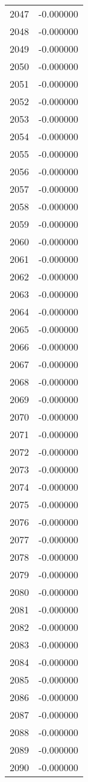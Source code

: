 \documentclass[12pt]{article}
\begin{document}
\begin{longtable}{@{}cc@{}}
2047 & -0.000000 \\
2048 & -0.000000 \\
2049 & -0.000000 \\
2050 & -0.000000 \\
2051 & -0.000000 \\
2052 & -0.000000 \\
2053 & -0.000000 \\
2054 & -0.000000 \\
2055 & -0.000000 \\
2056 & -0.000000 \\
2057 & -0.000000 \\
2058 & -0.000000 \\
2059 & -0.000000 \\
2060 & -0.000000 \\
2061 & -0.000000 \\
2062 & -0.000000 \\
2063 & -0.000000 \\
2064 & -0.000000 \\
2065 & -0.000000 \\
2066 & -0.000000 \\
2067 & -0.000000 \\
2068 & -0.000000 \\
2069 & -0.000000 \\
2070 & -0.000000 \\
2071 & -0.000000 \\
2072 & -0.000000 \\
2073 & -0.000000 \\
2074 & -0.000000 \\
2075 & -0.000000 \\
2076 & -0.000000 \\
2077 & -0.000000 \\
2078 & -0.000000 \\
2079 & -0.000000 \\
2080 & -0.000000 \\
2081 & -0.000000 \\
2082 & -0.000000 \\
2083 & -0.000000 \\
2084 & -0.000000 \\
2085 & -0.000000 \\
2086 & -0.000000 \\
2087 & -0.000000 \\
2088 & -0.000000 \\
2089 & -0.000000 \\
2090 & -0.000000 \\

\end{longtable}
\end{document}
